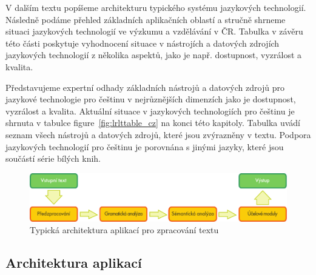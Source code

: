 \begin{multicols}{2}
V dalším textu popíšeme architekturu typického systému jazykových technologií. Následně podáme přehled základních aplikačních oblastí a stručně shrneme situaci jazykových technologií ve výzkumu a vzdělávání v ČR. Tabulka v závěru této části poskytuje vyhodnocení situace v nástrojích a datových zdrojích jazykových technologií z několika aspektů, jako je např. dostupnost, vyzrálost a kvalita.

Představujeme expertní odhady základních nástrojů a datových zdrojů pro jazykové technologie pro češtinu
v nejrůznějších dimenzích jako je dostupnost, vyzrálost a kvalita. Aktuální situace v jazykových technologiích pro češtinu je shrnuta v tabulce figure~\ref{fig:lrlttable_cz} na konci této kapitoly. Tabulka uvádí seznam všech nástrojů a datových zdrojů, které jsou zvýrazněny v textu. Podpora jazykových technologií pro češtinu je porovnána s jinými jazyky, které jsou součástí série bílých knih.

\begin{figure}[b]
  \center
  \includegraphics[width=\textwidth]{../_media/czech/text_processing_app_architecture}
  \caption{Typická architektura aplikací pro zpracování textu}
  \label{fig:textprocessingarch_cz}
\end{figure}
\subsection{Architektura aplikací}


\end{multicols}
